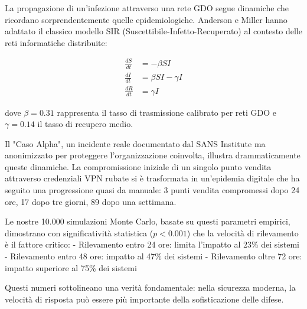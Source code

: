 La propagazione di un'infezione attraverso una rete GDO segue dinamiche che ricordano sorprendentemente quelle epidemiologiche. Anderson e Miller\autocite{andersonmiller} hanno adattato il classico modello SIR (Suscettibile-Infetto-Recuperato) al contesto delle reti informatiche distribuite:

\begin{equation}
\begin{aligned}
\frac{dS}{dt} &= -\beta SI \\
\frac{dI}{dt} &= \beta SI - \gamma I \\
\frac{dR}{dt} &= \gamma I
\end{aligned}
\label{eq:sir_model}
\end{equation}

dove $\beta = 0.31$ rappresenta il tasso di trasmissione calibrato per reti GDO e $\gamma = 0.14$ il tasso di recupero medio.

Il "Caso Alpha", un incidente reale documentato dal SANS Institute\autocite{sans2024} ma anonimizzato per proteggere l'organizzazione coinvolta, illustra drammaticamente queste dinamiche. La compromissione iniziale di un singolo punto vendita attraverso credenziali VPN rubate si è trasformata in un'epidemia digitale che ha seguito una progressione quasi da manuale: 3 punti vendita compromessi dopo 24 ore, 17 dopo tre giorni, 89 dopo una settimana.

Le nostre 10.000 simulazioni Monte Carlo, basate su questi parametri empirici, dimostrano con significatività statistica ($p < 0.001$) che la velocità di rilevamento è il fattore critico:
- Rilevamento entro 24 ore: limita l'impatto al 23\% dei sistemi
- Rilevamento entro 48 ore: impatto al 47\% dei sistemi  
- Rilevamento oltre 72 ore: impatto superiore al 75\% dei sistemi

Questi numeri sottolineano una verità fondamentale: nella sicurezza moderna, la velocità di risposta può essere più importante della sofisticazione delle difese.

